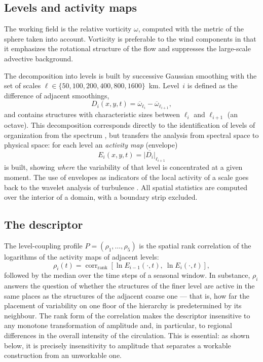 \documentclass[11pt,a4paper]{article}
\begin{document}
\subsection{Levels and activity maps}

The working field is the relative vorticity $\omega$, computed with the metric of the sphere taken into account. Vorticity is preferable to the wind components in that it emphasizes the rotational structure of the flow and suppresses the large-scale advective background.

The decomposition into levels is built by successive Gaussian smoothing with the set of scales $\ell\in\{50,100,200,400,800,1600\}$~km. Level~$i$ is defined as the difference of adjacent smoothings,
\begin{equation}
D_i(x,y,t)=\overline{\omega}_{\ell_i}-\overline{\omega}_{\ell_{i+1}},
\end{equation}
and contains structures with characteristic sizes between $\ell_i$ and $\ell_{i+1}$ (an octave). This decomposition corresponds directly to the identification of levels of organization from the spectrum \cite{Krenke2019}, but transfers the analysis from spectral space to physical space: for each level an \emph{activity map} (envelope)
\begin{equation}
E_i(x,y,t)=\overline{\lvert D_i\rvert}_{\ell_{i+1}}
\end{equation}
is built, showing \emph{where} the variability of that level is concentrated at a given moment. The use of envelopes as indicators of the local activity of a scale goes back to the wavelet analysis of turbulence \cite{Farge1992}. All spatial statistics are computed over the interior of a domain, with a boundary strip excluded.

\subsection{The descriptor}

The level-coupling profile $P=(\rho_1,\dots,\rho_5)$ is the spatial rank correlation of the logarithms of the activity maps of adjacent levels:
\begin{equation}
\rho_i(t)=\operatorname{corr}_{\mathrm{rank}}\!\left[\ln E_{i-1}(\cdot,t),\ \ln E_{i}(\cdot,t)\right],
\label{eq:rho}
\end{equation}
followed by the median over the time steps of a seasonal window. In substance, $\rho_i$ answers the question of whether the structures of the finer level are active in the same places as the structures of the adjacent coarse one --- that is, how far the placement of variability on one floor of the hierarchy is predetermined by its neighbour. The rank form of the correlation makes the descriptor insensitive to any monotone transformation of amplitude and, in particular, to regional differences in the overall intensity of the circulation. This is essential: as shown below, it is precisely insensitivity to amplitude that separates a workable construction from an unworkable one.
\end{document}
